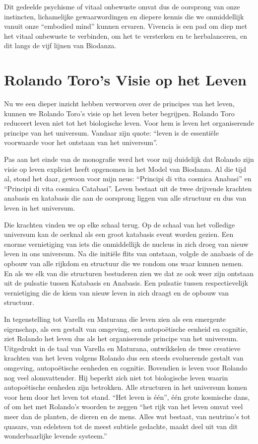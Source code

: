 \documentclass[
  11pt,
]{book}
\begin{document}
Dit gedeelde psychisme of vitaal onbewuste omvat dus de oorsprong van onze instincten, lichamelijke gewaarwordingen en diepere kennis die we onmiddellijk vanuit onze ``embodied mind'' kunnen ervaren. Vivencia is een pad om diep met het vitaal onbewuste te verbinden, om het te versterken en te herbalanceren, en dit langs de vijf lijnen van Biodanza.

\hypertarget{rolando-toros-visie-op-het-leven}{%
\section{Rolando Toro's Visie op het Leven}\label{rolando-toros-visie-op-het-leven}}

Nu we een dieper inzicht hebben verworven over de principes van het leven, kunnen we Rolando Toro's visie op het leven beter begrijpen.
Rolando Toro reduceert leven niet tot het biologische leven.
Voor hem is leven het organiserende principe van het universum.
Vandaar zijn quote: ``leven is de essentiële voorwaarde voor het ontstaan van het universum''.

Pas aan het einde van de monografie werd het voor mij duidelijk dat Rolando zijn visie op leven expliciet heeft opgenomen in het Model van Biodanza. Al die tijd al, stond het daar, gewoon voor mijn neus: ``Principi di vita cosmica Anabasi'' en ``Principi di vita cosmica Catabasi''.
Leven bestaat uit de twee drijvende krachten anabasis en katabasis die aan de oorsprong liggen van alle structuur en dus van leven in het universum.

Die krachten vinden we op elke schaal terug.
Op de schaal van het volledige universum kan de oerknal als een groot katabasis event worden gezien. Een enorme vernietiging van iets die onmiddellijk de nucleus in zich droeg van nieuw leven in ons universum. Na die initiële flits van ontstaan, volgde de anabasis of de opbouw van alle rijkdom en structuur die we rondom ons waar kunnen nemen.\\
En als we elk van die structuren bestuderen zien we dat ze ook weer zijn ontstaan uit de pulsatie tussen Katabasis en Anabasis. Een pulsatie tussen respectievelijk vernietiging die de kiem van nieuw leven in zich draagt en de opbouw van structuur.

In tegenstelling tot Varella en Maturana die leven zien als een emergente eigenschap, als een gestalt van omgeving, een autopoëtische eenheid en cognitie, ziet Rolando het leven dus als het organiserende principe van het universum. Uitgedrukt in de taal van Varella en Maturana, ontwikkelen de twee creatieve krachten van het leven volgens Rolando dus een steeds evoluerende gestalt van omgeving, autopoëtische eenheden en cognitie.
Bovendien is leven voor Rolando nog veel alomvattender. Hij beperkt zich niet tot biologische leven waarin autopoëtische eenheden zijn betrokken. Alle structuren in het universum komen voor hem door het leven tot stand. ``Het leven is één'', één grote kosmische dans, of om het met Rolando's woorden te zeggen ``het rijk van het leven omvat veel meer dan de planten, de dieren en de mens. Alles wat bestaat, van neutrino's tot quasars, van edelsteen tot de meest subtiele gedachte, maakt deel uit van dit wonderbaarlijke levende systeem.''
\end{document}

